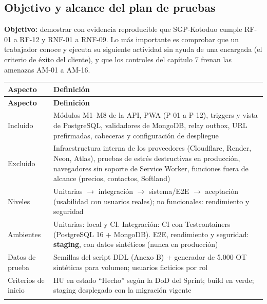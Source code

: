 \documentclass[11pt,a4paper]{article}
\begin{document}
\subsection{Objetivo y alcance del plan de pruebas}

\textbf{Objetivo:} demostrar con evidencia reproducible que SGP-Kotoduo cumple RF-01 a RF-12 y RNF-01 a RNF-09. Lo más importante es comprobar que un trabajador conoce y ejecuta su siguiente actividad sin ayuda de una encargada (el criterio de éxito del cliente), y que los controles del capítulo 7 frenan las amenazas AM-01 a AM-16.

\begingroup
\begin{longtable}{@{}>{\raggedright\arraybackslash\hspace{0pt}}p{}>{\raggedright\arraybackslash\hspace{0pt}}p{}@{}}
\toprule
\textbf{Aspecto} & \textbf{Definición} \\ \midrule
\endfirsthead
\toprule
\textbf{Aspecto} & \textbf{Definición} \\ \midrule
\endhead
\bottomrule
\endlastfoot
\mbox{Incluido} & Módulos M1--M8 de la API, PWA (\mbox{P-01} a \mbox{P-12}), triggers y vista de PostgreSQL, validadores de MongoDB, relay outbox, URL prefirmadas, cabeceras y configuración de despliegue \\ \addlinespace[0.25em]
\mbox{Excluido} & Infraestructura interna de los proveedores (Cloudflare, Render, Neon, Atlas), pruebas de estrés destructivas en producción, navegadores sin soporte de Service Worker, funciones fuera de alcance (precios, contactos, Softland) \\ \addlinespace[0.25em]
\mbox{Niveles} & Unitarias \ensuremath{\rightarrow}\allowbreak{} integración \ensuremath{\rightarrow}\allowbreak{} sistema/E2E \ensuremath{\rightarrow}\allowbreak{} aceptación (usabilidad con usuarios reales); no funcionales: rendimiento y seguridad \\ \addlinespace[0.25em]
\mbox{Ambientes} & Unitarias: local y CI. Integración: CI con Testcontainers (PostgreSQL 16 + MongoDB). E2E, rendimiento y seguridad: \textbf{staging}, con datos sintéticos (nunca en producción) \\ \addlinespace[0.25em]
Datos de prueba & Semillas del script DDL (Anexo B) + generador de 5.000 OT sintéticas para volumen; usuarios ficticios por rol \\ \addlinespace[0.25em]
Criterios de inicio & HU en estado ``Hecho'' según la DoD del Sprint; build en verde; staging desplegado con la migración vigente \\ \addlinespace[0.25em]

\end{longtable}
\end{document}
